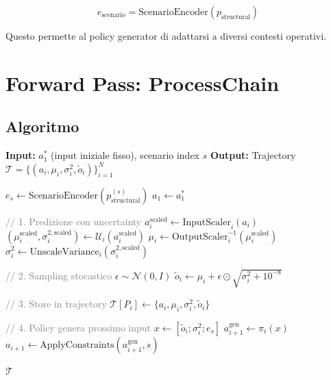 \documentclass[11pt,a4paper]{article}
\begin{document}
\begin{equation}
e_{\text{scenario}} = \text{ScenarioEncoder}(p_{\text{structural}})
\end{equation}

Questo permette al policy generator di adattarsi a diversi contesti operativi.

\section{Forward Pass: ProcessChain}

\subsection{Algoritmo}

\begin{algorithm}[H]
\caption{ProcessChain Forward Pass}
\begin{algorithmic}[1]
\State \textbf{Input:} $a_1^*$ (input iniziale fisso), scenario index $s$
\State \textbf{Output:} Trajectory $\mathcal{T} = \{(a_i, \mu_i, \sigma_i^2, \tilde{o}_i)\}_{i=1}^N$

\State $e_s \gets \text{ScenarioEncoder}(p_{\text{structural}}^{(s)})$
\State $a_1 \gets a_1^*$ 

    \State \textcolor{gray}{// 1. Predizione con uncertainty}
    \State $a_i^{\text{scaled}} \gets \text{InputScaler}_i(a_i)$
    \State $(\mu_i^{\text{scaled}}, \sigma_i^{2,\text{scaled}}) \gets \mathcal{U}_i(a_i^{\text{scaled}})$ 
    \State $\mu_i \gets \text{OutputScaler}_i^{-1}(\mu_i^{\text{scaled}})$
    \State $\sigma_i^2 \gets \text{UnscaleVariance}_i(\sigma_i^{2,\text{scaled}})$

    \State \textcolor{gray}{// 2. Sampling stocastico}
    \State $\epsilon \sim \mathcal{N}(0, I)$
    \State $\tilde{o}_i \gets \mu_i + \epsilon \odot \sqrt{\sigma_i^2 + 10^{-8}}$ \Comment{\textcolor{red}{Reparameterization}}

    \State \textcolor{gray}{// 3. Store in trajectory}
    \State $\mathcal{T}[P_i] \gets \{a_i, \mu_i, \sigma_i^2, \tilde{o}_i\}$

        \State \textcolor{gray}{// 4. Policy genera prossimo input}
        \State $x \gets [\tilde{o}_i; \sigma_i^2; e_s]$ \Comment{\textcolor{red}{Usa output campionato}}
        \State $a_{i+1}^{\text{gen}} \gets \pi_i(x)$ 
        \State $a_{i+1} \gets \text{ApplyConstraints}(a_{i+1}^{\text{gen}}, s)$ 
    \EndIf
\EndFor

\State \Return $\mathcal{T}$
\end{algorithmic}
\end{algorithm}
\end{document}
